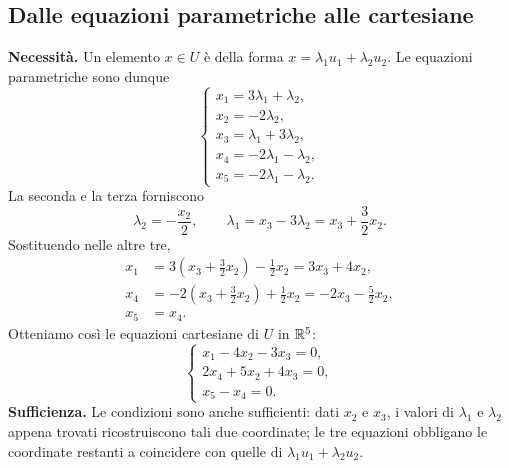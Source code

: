 \subsection{Dalle equazioni parametriche alle cartesiane}
\begin{svolgimento}
\textbf{Necessità.} Un elemento $x\in U$ è della forma $x=\lambda_1u_1+\lambda_2u_2$. Le equazioni parametriche sono dunque
\[
  \begin{cases}
    x_1=3\lambda_1+\lambda_2,\\
    x_2=-2\lambda_2,\\
    x_3=\lambda_1+3\lambda_2,\\
    x_4=-2\lambda_1-\lambda_2,\\
    x_5=-2\lambda_1-\lambda_2.
  \end{cases}
\]
La seconda e la terza forniscono
\[
  \lambda_2=-\frac{x_2}{2},\qquad
  \lambda_1=x_3-3\lambda_2=x_3+\frac32x_2.
\]
Sostituendo nelle altre tre,
\begin{align*}
  x_1&=3\left(x_3+\frac32x_2\right)-\frac12x_2
        =3x_3+4x_2,\\
  x_4&=-2\left(x_3+\frac32x_2\right)+\frac12x_2
        =-2x_3-\frac52x_2,\\
  x_5&=x_4.
\end{align*}
Otteniamo così le equazioni cartesiane di $U$ in $\mathbb{R}^5$:
\[
  \begin{cases}
    x_1-4x_2-3x_3=0,\\
    2x_4+5x_2+4x_3=0,\\
    x_5-x_4=0.
  \end{cases}
\]
\textbf{Sufficienza.} Le condizioni sono anche sufficienti: dati $x_2$ e $x_3$, i valori di $\lambda_1$ e $\lambda_2$ appena trovati ricostruiscono tali due coordinate; le tre equazioni obbligano le coordinate restanti a coincidere con quelle di $\lambda_1u_1+\lambda_2u_2$.
\end{svolgimento}

